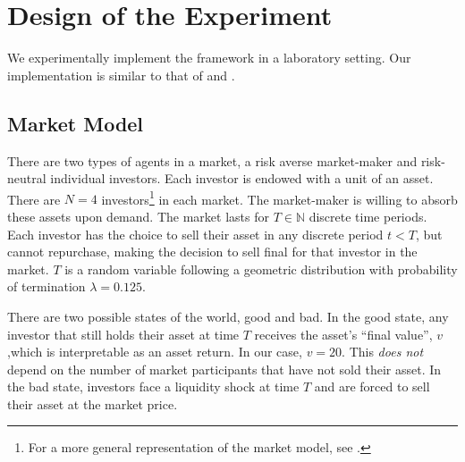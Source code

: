 \documentclass[11pt]{article}
\begin{document}









\section{Design of the Experiment}
We experimentally implement the \cite{bernardo2004liquidity} framework in a laboratory setting. Our implementation is similar to that of \cite{magnani2020dynamic} and \cite{choi2022market}.

\subsection{Market Model} \label{sec:market model}



There are two types of agents in a market, a risk averse market-maker and risk-neutral individual investors. Each investor is endowed with a unit of an asset. There are $N=4$ investors\footnote{For a more general representation of the market model, see \cite{magnani2020dynamic}.} in each market. The market-maker is willing to absorb these assets upon demand. The market lasts for $T \in \mathbb{N}$ discrete time periods. Each investor has the choice to sell their asset in any discrete period $t < T$, but cannot repurchase, making the decision to sell final for that investor in the market. $T$ is a random variable following a geometric distribution with probability of termination $\lambda = 0.125$.

There are two possible states of the world, good and bad. In the good state, any investor that still holds their asset at time $T$ receives the asset's ``final value'', $v$ ,which is interpretable as an asset return. In our case, $v=20$. This \textit{does not} depend on the number of market participants that have not sold their asset. In the bad state, investors face a liquidity shock at time $T$ and are forced to sell their asset at the market price.
\end{document}
